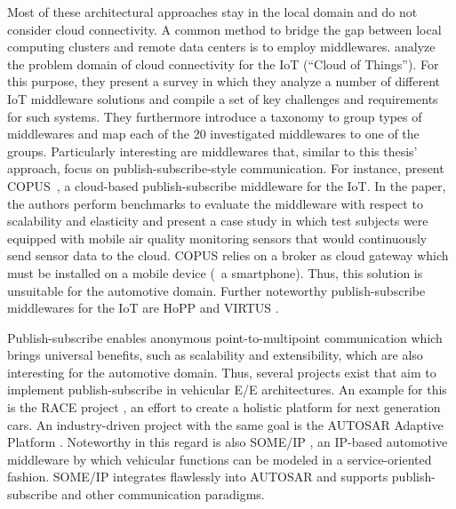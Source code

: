 Most of these architectural approaches stay in the local domain and do not consider cloud connectivity. A common method to bridge the gap between local computing clusters and remote data centers is to employ middlewares.
\citeauthor*{farahzadi2017middleware} analyze the problem domain of cloud connectivity for the IoT (``Cloud of Things'')\cite{farahzadi2017middleware}. For this purpose, they present a survey in which they analyze a number of different IoT middleware solutions and compile a set of key challenges and requirements for such systems. They furthermore introduce a taxonomy to group types of middlewares and map each of the 20 investigated middlewares to one of the groups. 
Particularly interesting are middlewares that, similar to this thesis' approach, focus on publish-subscribe-style communication.
For instance, \citeauthor*{antonic2016mobile} present COPUS~\cite{antonic2016mobile}, a cloud-based publish-subscribe middleware for the IoT. In the paper, the authors perform benchmarks to evaluate the middleware with respect to scalability and elasticity and present a case study in which test subjects were equipped with mobile air quality monitoring sensors that would continuously send sensor data to the cloud. COPUS relies on a broker as cloud gateway which must be installed on a mobile device (\eg\ a smartphone). Thus, this solution is unsuitable for the automotive domain.
Further noteworthy publish-subscribe middlewares for the IoT are HoPP \cite{gundougan2018hopp} and VIRTUS \cite{bazzani2012enabling}.

Publish-subscribe enables anonymous point-to-multipoint communication which
\linebreak
brings universal benefits, such as scalability and extensibility, which are also interesting for the automotive domain.
Thus, several projects exist that aim to implement publish-subscribe in vehicular E/E architectures.
An example for this is the RACE project \cite{sommer2013race}, an effort to create a holistic platform for next generation cars.
An industry-driven project with the same goal is the AUTOSAR Adaptive Platform \cite{furst2016autosar}.
Noteworthy in this regard is also SOME/IP \cite{volker2013some}, an IP-based automotive middleware by which vehicular functions can be modeled in a service-oriented fashion. SOME/IP integrates flawlessly into AUTOSAR and supports publish-subscribe and other communication paradigms.

